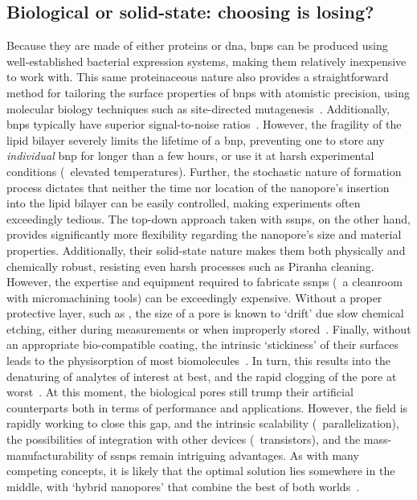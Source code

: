 \subsection{Biological or solid-state: choosing is losing?}
%

Because they are made of either proteins or \gls{dna}, \glspl{bnp} can be produced using well-established
bacterial expression systems, making them relatively inexpensive to work with. This same proteinaceous nature
also provides a straightforward method for tailoring the surface properties of \glspl{bnp} with atomistic
precision, using molecular biology techniques such as site-directed
mutagenesis~\cite{Howorka-2001,RinconRestrepo-2011}. Additionally, \glspl{bnp} typically have superior
signal-to-noise ratios~\cite{Fragasso-2020}. However, the fragility of the lipid bilayer severely limits the
lifetime of a \gls{bnp}, preventing one to store any \emph{individual} \gls{bnp} for longer than a few hours,
or use it at harsh experimental conditions (\eg~elevated temperatures). Further, the stochastic nature of
formation process dictates that neither the time nor location of the nanopore's insertion into the lipid
bilayer can be easily controlled, making experiments often exceedingly tedious. The top-down approach taken
with \glspl{ssnp}, on the other hand, provides significantly more flexibility regarding the nanopore's size
and material properties. Additionally, their solid-state nature makes them both physically and chemically
robust, resisting even harsh processes such as Piranha cleaning. However, the expertise and equipment required
to fabricate \glspl{ssnp} (\ie~a cleanroom with micromachining tools) can be exceedingly expensive. Without a
proper protective layer, such as , the size of a  pore is known to `drift' due slow
chemical etching, either during measurements or when improperly stored~\cite{Chou-2020}. Finally, without an
appropriate bio-compatible coating, the intrinsic `stickiness' of their surfaces leads to the physisorption
of most biomolecules~\cite{Eggenberger-2019,Awasthi-2020}. In turn, this results into the denaturing of
analytes of interest at best, and the rapid clogging of the pore at worst~\cite{Yusko-2011}. At this moment,
the biological pores still trump their artificial counterparts both in terms of performance and applications.
However, the field is rapidly working to close this gap, and the intrinsic scalability (\eg~parallelization),
the possibilities of integration with other devices (\eg~transistors), and the mass-manufacturability of
\glspl{ssnp} remain intriguing advantages. As with many competing concepts, it is likely that the optimal
solution lies somewhere in the middle, with `hybrid nanopores' that combine the best of both
worlds~\cite{Hall-2010,Im-2010,Cai-2018}.

